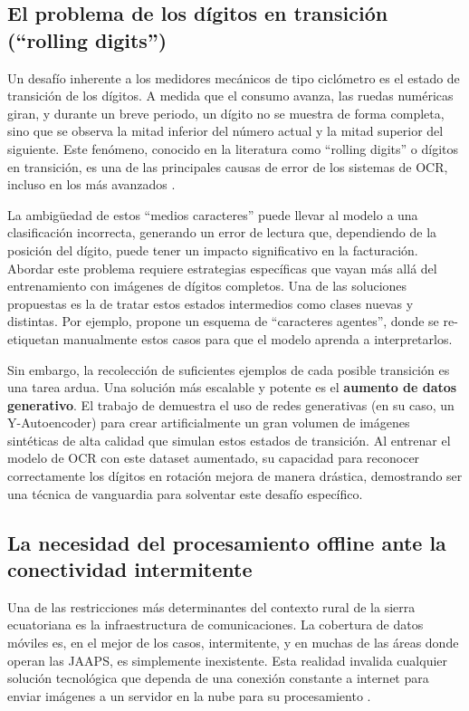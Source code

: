 \subsection{El problema de los dígitos en transición (``rolling digits'')}
\label{ssec:rolling_digits}

Un desafío inherente a los medidores mecánicos de tipo ciclómetro es el estado de transición de los dígitos. A medida que el consumo avanza, las ruedas numéricas giran, y durante un breve periodo, un dígito no se muestra de forma completa, sino que se observa la mitad inferior del número actual y la mitad superior del siguiente. Este fenómeno, conocido en la literatura como ``rolling digits'' o dígitos en transición, es una de las principales causas de error de los sistemas de OCR, incluso en los más avanzados \parencite{Laroca2021Towards}.

La ambigüedad de estos ``medios caracteres'' puede llevar al modelo a una clasificación incorrecta, generando un error de lectura que, dependiendo de la posición del dígito, puede tener un impacto significativo en la facturación. Abordar este problema requiere estrategias específicas que vayan más allá del entrenamiento con imágenes de dígitos completos. Una de las soluciones propuestas es la de tratar estos estados intermedios como clases nuevas y distintas. Por ejemplo, \textcite{Shen2023} propone un esquema de ``caracteres agentes'', donde se re-etiquetan manualmente estos casos para que el modelo aprenda a interpretarlos.

Sin embargo, la recolección de suficientes ejemplos de cada posible transición es una tarea ardua. Una solución más escalable y potente es el \textbf{aumento de datos generativo}. El trabajo de \textcite{Sripanuskul2022Generative} demuestra el uso de redes generativas (en su caso, un Y-Autoencoder) para crear artificialmente un gran volumen de imágenes sintéticas de alta calidad que simulan estos estados de transición. Al entrenar el modelo de OCR con este dataset aumentado, su capacidad para reconocer correctamente los dígitos en rotación mejora de manera drástica, demostrando ser una técnica de vanguardia para solventar este desafío específico.

\subsection{La necesidad del procesamiento offline ante la conectividad intermitente}
\label{ssec:offline_processing_need}

Una de las restricciones más determinantes del contexto rural de la sierra ecuatoriana es la infraestructura de comunicaciones. La cobertura de datos móviles es, en el mejor de los casos, intermitente, y en muchas de las áreas donde operan las JAAPS, es simplemente inexistente. Esta realidad invalida cualquier solución tecnológica que dependa de una conexión constante a internet para enviar imágenes a un servidor en la nube para su procesamiento \parencite{Fieldeke2021}.


